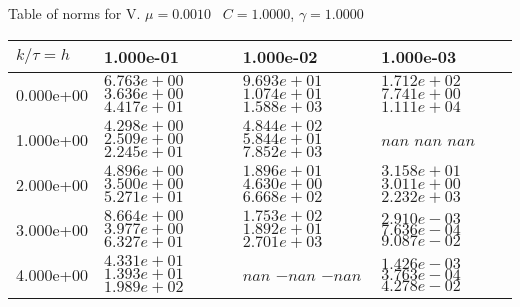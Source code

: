 \begin{center}
Table of norms for V. $\mu = 0.0010$ \, $C = 1.0000$, $\gamma = 1.0000$
  
\begin{tabular}{|p{1in}|p{1in}|p{1in}|p{1in}|} \hline
$k / \tau = h$ &1.000e-01 &1.000e-02 &1.000e-03 \\ \hline 
0.000e+00 & $6.763e+00$  $3.636e+00$  $4.417e+01$  & $9.693e+01$  $1.074e+01$  $1.588e+03$  & $1.712e+02$  $7.741e+00$  $1.111e+04$  \\ \hline 
1.000e+00 & $4.298e+00$  $2.509e+00$  $2.245e+01$  & $4.844e+02$  $5.844e+01$  $7.852e+03$  & $nan$  $nan$  $nan$  \\ \hline 
2.000e+00 & $4.896e+00$  $3.500e+00$  $5.271e+01$  & $1.896e+01$  $4.630e+00$  $6.668e+02$  & $3.158e+01$  $3.011e+00$  $2.232e+03$  \\ \hline 
3.000e+00 & $8.664e+00$  $3.977e+00$  $6.327e+01$  & $1.753e+02$  $1.892e+01$  $2.701e+03$  & $2.910e-03$  $7.636e-04$  $9.087e-02$  \\ \hline 
4.000e+00 & $4.331e+01$  $1.393e+01$  $1.989e+02$  & $nan$  $-nan$  $-nan$  & $1.426e-03$  $3.763e-04$  $4.278e-02$  \\ \hline 

\end{tabular}\\[20pt]
\end{center}
